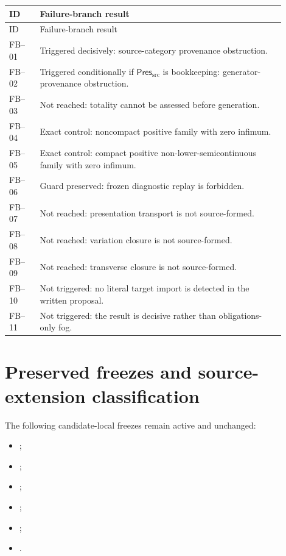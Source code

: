 \documentclass[11pt]{article}
\newcommand{\PresSrc}{\mathsf{Pres}_{\mathrm{src}}}
\begin{document}
\begin{longtable}{P{0.10\linewidth}P{0.80\linewidth}}
\toprule
ID & Failure-branch result \\
\midrule
\endfirsthead
\toprule
ID & Failure-branch result \\
\midrule
\endhead
FB--01 & Triggered decisively: source-category provenance obstruction.\\
FB--02 & Triggered conditionally if \(\PresSrc\) is bookkeeping: generator-provenance obstruction.\\
FB--03 & Not reached: totality cannot be assessed before generation.\\
FB--04 & Exact control: noncompact positive family with zero infimum.\\
FB--05 & Exact control: compact positive non-lower-semicontinuous family with zero infimum.\\
FB--06 & Guard preserved: frozen diagnostic replay is forbidden.\\
FB--07 & Not reached: presentation transport is not source-formed.\\
FB--08 & Not reached: variation closure is not source-formed.\\
FB--09 & Not reached: transverse closure is not source-formed.\\
FB--10 & Not triggered: no literal target import is detected in the written proposal.\\
FB--11 & Not triggered: the result is decisive rather than obligations-only fog.\\
\bottomrule
\end{longtable}

\section{Preserved freezes and source-extension classification}

The following candidate-local freezes remain active and unchanged:
\begin{itemize}
  \item {};
  \item {};
  \item {};
  \item {};
  \item {};
  \item {}.
\end{itemize}
\end{document}

